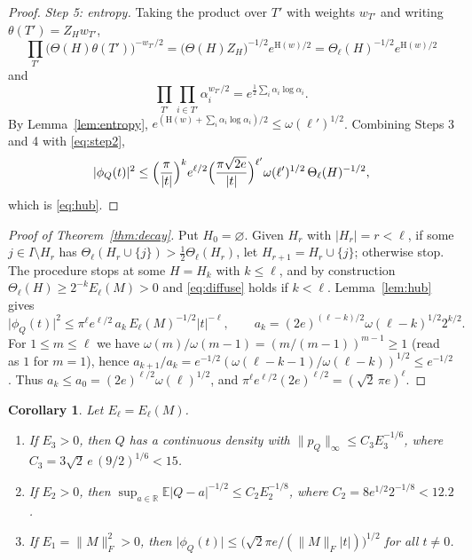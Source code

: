 \documentclass[11pt]{amsart}
\numberwithin{equation}{section}
\newtheorem{corollary}[theorem]{Corollary}
\theoremstyle{definition}
\theoremstyle{remark}
\newcommand{\R}{\mathbb R}
\newcommand{\E}{\mathbb E}
\newcommand{\1}{\mathbf 1}
\newcommand{\norm}[1]{\lVert #1\rVert}
\newcommand{\abs}[1]{\lvert #1\rvert}
\begin{document}
\begin{proof}
\emph{Step 5: entropy.} Taking the product over $T'$ with weights $w_{T'}$ and writing $\theta(T')=Z_Hw_{T'}$,
\[
\prod_{T'}\bigl(\Theta(H)\theta(T')\bigr)^{-w_{T'}/2}=\bigl(\Theta(H)Z_H\bigr)^{-1/2}e^{\mathrm H(w)/2}=\Theta_\ell(H)^{-1/2}e^{\mathrm H(w)/2}
\]
and
\[
\prod_{T'}\prod_{i\in T'}\alpha_i^{w_{T'}/2}=e^{\frac12\sum_i\alpha_i\log\alpha_i}.
\]
By Lemma~\ref{lem:entropy}, $e^{(\mathrm H(w)+\sum_i\alpha_i\log\alpha_i)/2}\le \omega(\ell')^{1/2}$. Combining Steps 3 and 4 with \eqref{eq:step2},
\[
\abs{\phi_Q(t)}^2\le\Bigl(\frac\pi{\abs t}\Bigr)^ke^{\ell/2}\Bigl(\frac{\pi\sqrt{2e}}{\abs t}\Bigr)^{\ell'}\omega(\ell')^{1/2}\,\Theta_\ell(H)^{-1/2},
\]
which is \eqref{eq:hub}.
\end{proof}

\begin{proof}[Proof of Theorem~\ref{thm:decay}]
Put $H_0=\varnothing$. Given $H_r$ with $\abs{H_r}=r<\ell$, if some $j\in I\setminus H_r$ has $\Theta_\ell(H_r\cup\{j\})>\frac12\Theta_\ell(H_r)$, let $H_{r+1}=H_r\cup\{j\}$; otherwise stop. The procedure stops at some $H=H_k$ with $k\le\ell$, and by construction $\Theta_\ell(H)\ge2^{-k}E_\ell(M)>0$ and \eqref{eq:diffuse} holds if $k<\ell$. Lemma~\ref{lem:hub} gives
\[
\abs{\phi_Q(t)}^2\le\pi^\ell e^{\ell/2}\,a_k\,E_\ell(M)^{-1/2}\abs t^{-\ell},\qquad a_k=(2e)^{(\ell-k)/2}\omega(\ell-k)^{1/2}2^{k/2}.
\]
For $1\le m\le\ell$ we have $\omega(m)/\omega(m-1)=(m/(m-1))^{m-1}\ge1$ (read as $1$ for $m=1$), hence $a_{k+1}/a_k=e^{-1/2}(\omega(\ell-k-1)/\omega(\ell-k))^{1/2}\le e^{-1/2}$. Thus $a_k\le a_0=(2e)^{\ell/2}\omega(\ell)^{1/2}$, and $\pi^\ell e^{\ell/2}(2e)^{\ell/2}=(\sqrt2\,\pi e)^\ell$.
\end{proof}

\begin{corollary}\label{cor:decay}
Let $E_\ell=E_\ell(M)$.
\begin{enumerate}
\item[(a)] If $E_3>0$, then $Q$ has a continuous density with $\norm{p_Q}_\infty\le C_3E_3^{-1/6}$, where $C_3=3\sqrt2\,e\,(9/2)^{1/6}<15$.
\item[(b)] If $E_2>0$, then $\sup_{a\in\R}\E\abs{Q-a}^{-1/2}\le C_2E_2^{-1/8}$, where $C_2=8e^{1/2}2^{-1/8}<12.2$.
\item[(c)] If $E_1=\norm M_F^2>0$, then $\abs{\phi_Q(t)}\le\bigl(\sqrt2\pi e/(\norm M_F\abs t)\bigr)^{1/2}$ for all $t\ne0$.
\end{enumerate}
\end{corollary}
\end{document}
